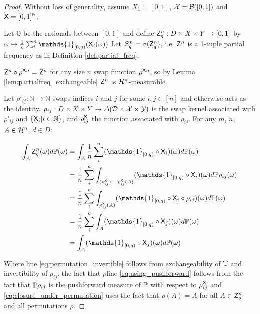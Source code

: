 \begin{proof}
Without loss of generality, assume $X_1=[0,1]$, $\mathcal{X}=\mathcal{B}([0,1])$ and $\mathsf{X}=[0,1]^{\mathbb{N}}$.

Let $\mathbb{Q}$ be the rationals between $[0,1]$ and define $\mathsf{Z}_q^n:D\times X\times Y \to [0,1]$ by $\omega \mapsto \frac{1}{n}\sum_{i}^n \mathds{1}_{[0,q)}(\RV{X}_i(\omega))$ Let $\mathcal{Z}^n_q=\sigma(\mathsf{Z}_q^n)$, i.e. $\mathsf{Z}^n$ is a 1-tuple partial frequency as in Definition \ref{def:partial_freq}.

$\mathsf{Z}^n\circ\rho^{\mathsf{X}n}=\mathsf{Z}^n$ for any size $n$ swap function $\rho^{\mathsf{X}n}$, so by Lemma \ref{lem:partialfreq_exchangeable} $\mathsf{Z}^n$ is $\mathcal{H}^n$-measurable.

Let $\rho'_{ij}:\mathbb{N}\to\mathbb{N}$ swaps indices $i$ and $j$ for some $i,j\in[n]$ and otherwise acts as the identity. $\rho_{ij}:D\times X\times Y\to \Delta(\mathcal{D}\times \mathcal{X}\times \mathcal{Y})$ is the swap kernel associated with $\rho'_{ij}$ and $\{\mathsf{X}_i|i\in \mathbb{N}\}$, and $\rho^{\mathsf{X}}_{ij}$ the function associated with $\rho_{ij}$. For any $m$, $n$, $A\in \mathcal{H}^n$, $d\in D$: 

\begin{align}
    \int_{A} \RV{Z}_q^{n} (\omega) d\prob{P}(\omega) &= \int_{A} \frac{1}{n}\sum_{i}^{n} (\mathds{1}_{[0,q)}\circ \RV{X}_i)(\omega)d\prob{P}(\omega)\\
    &= \frac{1}{n}\sum_{i}^{n} \int_{(\rho^{\RV{X}}_{ij})^{-1}\rho^{\RV{X}}_{ij}(A)} (\mathds{1}_{[0,q)}\circ \RV{X}_i)(\omega)d\prob{P}\rho_{ij}(\omega)\label{eq:permutation_invertible}\\
    &= \frac{1}{n}\sum_{i}^{n} \int_{\rho^{\RV{X}}_{ij}(A)} (\mathds{1}_{[0,q)}\circ \RV{X}_{i}\circ \rho_{ij}) (\omega)d\prob{P}(\omega)\label{eq:using_pushforward}\\
    &= \frac{1}{n}\sum_{i}^{n} \int_{A} (\mathds{1}_{[0,q)}\circ \RV{X}_{j})(\omega)d\prob{P}(\omega)\label{eq:closure_under_permutation}\\
    &= \int_{A} (\mathds{1}_{[0,q)} \circ \RV{X}_j)(\omega)d\prob{P}(\omega) \label{eq:cond_expectation_first}
\end{align}

Where line \ref{eq:permutation_invertible} follows from exchangeability of $\mathbb{T}$ and invertibility of $\rho_{ij}$. the fact that $\rho$line \ref{eq:using_pushforward} follows from the fact that $\mathbb{P}\rho_{ij}$ is the pushforward measure of $\mathbb{P}$ with respect to $\rho^{\mathsf{X}}_{ij}$ and \ref{eq:closure_under_permutation} uses the fact that $\rho(A) = A$ for all $A\in \mathsf{Z}^n_q$ and all permutations $\rho$.


\end{proof}
